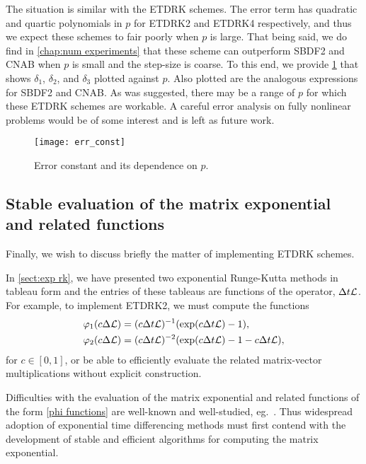 The situation is similar with the ETDRK schemes. The error term has quadratic and quartic polynomials in $p$ for ETDRK2 and ETDRK4 respectively, and thus we expect these schemes to fair poorly when $p$ is large. That being said, we do find in \cref{chap:num experiments} that these scheme can outperform SBDF2 and CNAB when $p$ is small and the step-size is coarse. To this end, we provide \cref{fig:err p dep} that shows $\delta_1$, $\delta_2$, and $\delta_3$ plotted against $p$. Also plotted are the analogous expressions for SBDF2 and CNAB. As was suggested, there may be a range of $p$ for which these ETDRK schemes are workable. A careful error analysis on fully nonlinear problems would be of some interest and is left as future work.

\begin{figure}[htb!]
        \centering
\texttt{[image: err\_const]}
\caption[Error constant and its dependence on $p$.]{Error constant and its dependence on $p$. }
\label{fig:err p dep}
\end{figure}

\subsection{Stable evaluation of the matrix exponential and related functions}
Finally, we wish to discuss briefly the matter of implementing ETDRK schemes.

In \cref{sect:exp rk}, we have presented two exponential Runge-Kutta methods in tableau form and the entries of these tableaus are functions of the operator, $\Delta t\mathcal{L}$.  For example, to implement ETDRK2, we must compute the functions 
\begin{align}
\varphi_1(c\Delta \mathcal{L}) &= (c\Delta t \mathcal{L})^{-1}(\exp(c\Delta t \mathcal{L}) - 1),
\\
\varphi_2(c\Delta \mathcal{L}) &= (c\Delta t\mathcal{L})^{-2}(\exp(c\Delta t \mathcal{L})  -1 - c\Delta t \mathcal{L}) ,
\end{align}
for $c \in [0,1]$, or be able to efficiently evaluate the related matrix-vector multiplications without explicit construction.

Difficulties with the evaluation of the matrix exponential and related functions of the form \cref{phi functions} are well-known and well-studied, eg.\ \cite{moler2003nineteen,higham2002accuracy,higham2008functions,hochbruck1997krylov}. Thus widespread adoption of exponential time differencing methods must first contend with the development of stable and efficient algorithms for computing the matrix exponential. 


